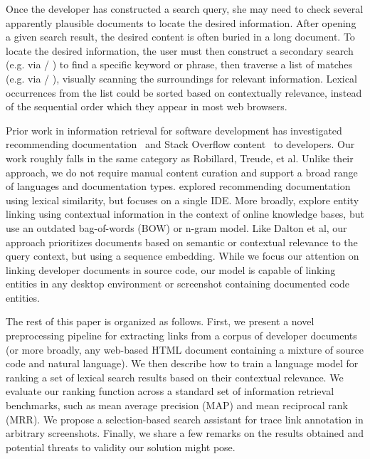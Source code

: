 \documentclass[sigconf,authordraft]{acmart}
\begin{document}
Once the developer has constructed a search query, she may need to check several apparently plausible documents to locate the desired information. After opening a given search result, the desired content is often buried in a long document. To locate the desired information, the user must then construct a secondary search (e.g. via \keys{\ctrl} / ) to find a specific keyword or phrase, then traverse a list of matches (e.g. via \keys{\return} / \keys{\shift + \return}), visually scanning the surroundings for relevant information. Lexical occurrences from the list could be sorted based on contextually relevance, instead of the sequential order which they appear in most web browsers.

Prior work in information retrieval for software development has investigated recommending documentation~\citep{robillard2015recommending} and Stack Overflow content~\citep{treude2016augmenting} to developers. Our work roughly falls in the same category as Robillard, Treude, et al. Unlike their approach, we do not require manual content curation and support a broad range of languages and documentation types. \citet{rahman2014towards} explored recommending documentation using lexical similarity, but focuses on a single IDE. More broadly, \citet{el2001linking, dalton2013neighborhood, dalton2014entity} explore entity linking using contextual information in the context of online knowledge bases, but use an outdated bag-of-words (BOW) or n-gram model. Like Dalton et al, our approach prioritizes documents based on semantic or contextual relevance to the query context, but using a sequence embedding. While we focus our attention on linking developer documents in source code, our model is capable of linking entities in any desktop environment or screenshot containing documented code entities.

The rest of this paper is organized as follows. First, we present a novel preprocessing pipeline for extracting links from a corpus of developer documents (or more broadly, any web-based HTML document containing a mixture of source code and natural language). We then describe how to train a language model for ranking a set of lexical search results based on their contextual relevance. We evaluate our ranking function across a standard set of information retrieval benchmarks, such as mean average precision (MAP) and mean reciprocal rank (MRR). We propose a selection-based search assistant for trace link annotation in arbitrary screenshots. Finally, we share a few remarks on the results obtained and potential threats to validity our solution might pose.
\end{document}

